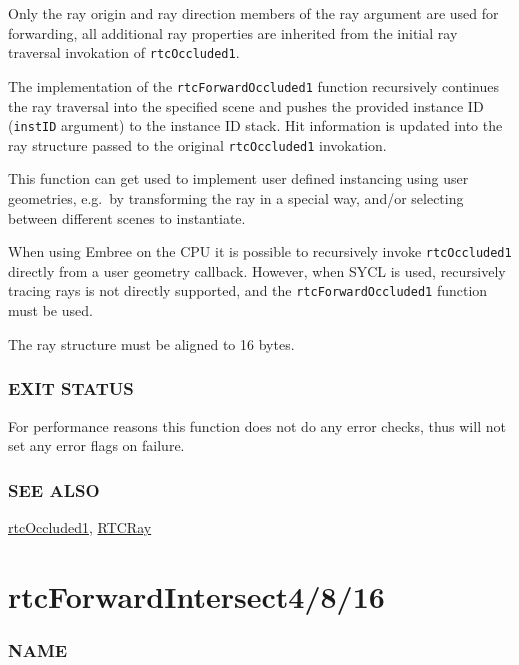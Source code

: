 Only the ray origin and ray direction members of the ray argument are
used for forwarding, all additional ray properties are inherited from
the initial ray traversal invokation of \texttt{rtcOccluded1}.

The implementation of the \texttt{rtcForwardOccluded1} function
recursively continues the ray traversal into the specified scene and
pushes the provided instance ID (\texttt{instID} argument) to the
instance ID stack. Hit information is updated into the ray structure
passed to the original \texttt{rtcOccluded1} invokation.

This function can get used to implement user defined instancing using
user geometries, e.g.~by transforming the ray in a special way, and/or
selecting between different scenes to instantiate.

When using Embree on the CPU it is possible to recursively invoke
\texttt{rtcOccluded1} directly from a user geometry callback. However,
when SYCL is used, recursively tracing rays is not directly supported,
and the \texttt{rtcForwardOccluded1} function must be used.

The ray structure must be aligned to 16 bytes.

\subsubsection{EXIT STATUS}\label{exit-status}

For performance reasons this function does not do any error checks, thus
will not set any error flags on failure.

\subsubsection{SEE ALSO}\label{see-also}

\hyperref[rtcoccluded1]{rtcOccluded1}, \hyperref[rtcray]{RTCRay}

\pagebreak

\section{rtcForwardIntersect4/8/16}\label{rtcforwardintersect4816}

\subsubsection{NAME}\label{name}

\begin{Shaded}
\begin{Highlighting}[]
\OperatorTok{/}\OperatorTok{/} \OperatorTok{{-}}
\end{Highlighting}
\end{Shaded}

